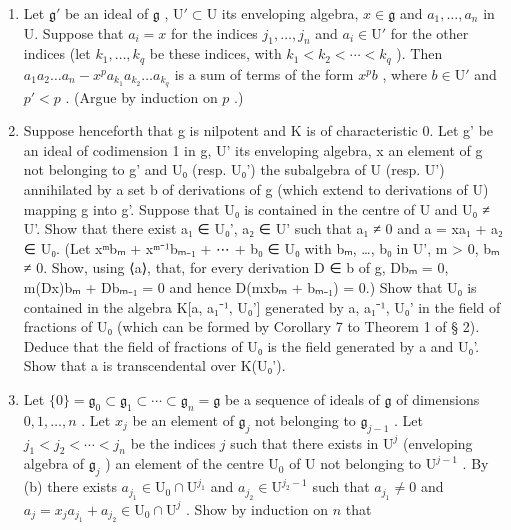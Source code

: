 \begin{enumerate}
\def\labelenumi{(\alph{enumi})}
\item
  Let \(\mathfrak{g}'\) be an ideal of \(\mathfrak{g}\) , \(\mathrm{U}' \subset \mathrm{U}\) its enveloping algebra, \(x \in \mathfrak{g}\) and \(a_1, \ldots, a_n\) in U. Suppose that \(a_i = x\) for the indices \(j_1, \ldots, j_n\) and \(a_i \in \mathrm{U}'\) for the other indices (let \(k_1, \ldots, k_q\) be these indices, with \(k_1 < k_2 < \cdots < k_q\) ). Then \(a_1 a_2 \ldots a_n - x^p a_{k_1}a_{k_2} \ldots a_{k_q}\) is a sum of terms of the form \(x^p b\) , where \(b \in \mathrm{U}'\) and \(p' < p\) . (Argue by induction on \(p\) .)
\item
  Suppose henceforth that g is nilpotent and K is of characteristic 0. Let g' be an ideal of codimension 1 in g, U' its enveloping algebra, x an element of g not belonging to g' and U₀ (resp. U₀') the subalgebra of U (resp. U') annihilated by a set b of derivations of g (which extend to derivations of U) mapping g into g'. Suppose that U₀ is contained in the centre of U and U₀ ≠ U'. Show that there exist a₁ ∈ U₀', a₂ ∈ U' such that a₁ ≠ 0 and a = xa₁ + a₂ ∈ U₀. (Let xᵐbₘ + xᵐ⁻¹bₘ₋₁ + ⋯ + b₀ ∈ U₀ with bₘ, \ldots, b₀ in U', m \textgreater{} 0, bₘ ≠ 0. Show, using ⟨a⟩, that, for every derivation D ∈ b of g, Dbₘ = 0, m(Dx)bₘ + Dbₘ₋₁ = 0 and hence D(mxbₘ + bₘ₋₁) = 0.) Show that U₀ is contained in the algebra K{[}a, a₁⁻¹, U₀'{]} generated by a, a₁⁻¹, U₀' in the field of fractions of U₀ (which can be formed by Corollary 7 to Theorem 1 of § 2). Deduce that the field of fractions of U₀ is the field generated by a and U₀'. Show that a is transcendental over K(U₀').
\item
  Let \(\{0\} = \mathfrak{g}_0 \subset \mathfrak{g}_1 \subset \cdots \subset \mathfrak{g}_n = \mathfrak{g}\) be a sequence of ideals of \(\mathfrak{g}\) of dimensions \(0, 1, \ldots, n\) . Let \(x_j\) be an element of \(\mathfrak{g}_j\) not belonging to \(\mathfrak{g}_{j-1}\) . Let \(j_1 < j_2 < \cdots < j_n\) be the indices \(j\) such that there exists in \(\mathrm{U}^j\) (enveloping algebra of \(\mathfrak{g}_j\) ) an element of the centre \(\mathrm{U}_0\) of \(\mathrm{U}\) not belonging to \(\mathrm{U}^{j-1}\) . By (b) there exists \(a_{j_1} \in \mathrm{U}_0 \cap \mathrm{U}^{j_1}\) and \(a_{j_2} \in \mathrm{U}^{j_2-1}\) such that \(a_{j_1} \neq 0\) and \(a_j = x_j a_{j_1} + a_{j_2} \in \mathrm{U}_0 \cap \mathrm{U}^{j}\) . Show by induction on \(n\) that
\end{enumerate}

